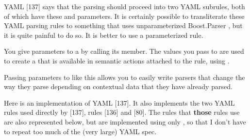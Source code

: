 \documentclass{MyBook}
\begin{document}
YAML {[}137{]} says that the parsing should proceed into two YAML subrules, both of which have these  and  parameters. It is certainly possible to transliterate these YAML parsing rules to something that uses unparameterized Boost.Parser , but it is quite painful to do so. It is better to use a parameterized rule.

You give parameters to a  by calling its  member. The values you pass to  are used to create a  that is available in semantic actions attached to the rule, using .

Passing parameters to  like this allows you to easily write parsers that change the way they parse depending on contextual data that they have already parsed.

Here is an implementation of YAML {[}137{]}. It also implements the two YAML rules used directly by {[}137{]}, rules {[}136{]} and {[}80{]}. The rules that \textbf{those} rules use are also represented below, but are implemented using only , so that I don't have to repeat too much of the (very large) YAML spec.
\end{document}
